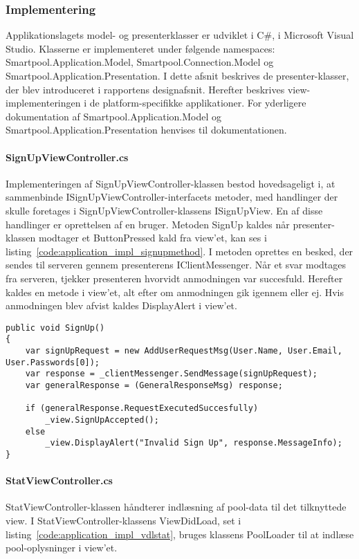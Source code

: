 \subsubsection{Implementering}
Applikationslagets model- og presenterklasser er udviklet i C\#, i Microsoft Visual Studio. Klasserne er implementeret under følgende namespaces: Smartpool.Application.Model, Smartpool.Connection.Model og Smartpool.Application.Presentation. I dette afsnit beskrives de presenter-klasser, der blev introduceret i rapportens designafsnit. Herefter beskrives view-implementeringen i de platform-specifikke applikationer. For yderligere dokumentation af Smartpool.Application.Model og Smartpool.Application.Presentation henvises til dokumentationen.

\paragraph{SignUpViewController.cs}
Implementeringen af SignUpViewController-klassen bestod hovedsageligt i, at sammenbinde ISignUpViewController-interfacets metoder, med handlinger der skulle foretages i SignUpViewController-klassens ISignUpView. En af disse handlinger er oprettelsen af en bruger. Metoden SignUp kaldes når presenter-klassen modtager et ButtonPressed kald fra view'et, kan ses i listing~\ref{code:application_impl_signupmethod}. I metoden oprettes en besked, der sendes til serveren gennem presenterens IClientMessenger. Når et svar modtages fra serveren, tjekker presenteren hvorvidt anmodningen var succesfuld. Herefter kaldes en metode i view'et, alt efter om anmodningen gik igennem eller ej. Hvis anmodningen blev afvist kaldes DisplayAlert i view'et.

\begin{lstlisting}[caption={SignUp()},label={code:application_impl_signupmethod}]
public void SignUp()
{
	var signUpRequest = new AddUserRequestMsg(User.Name, User.Email, User.Passwords[0]);
	var response = _clientMessenger.SendMessage(signUpRequest);
	var generalResponse = (GeneralResponseMsg) response;

	if (generalResponse.RequestExecutedSuccesfully)
		_view.SignUpAccepted();
	else
		_view.DisplayAlert("Invalid Sign Up", response.MessageInfo);
}
\end{lstlisting}

\paragraph{StatViewController.cs}
StatViewController-klassen håndterer indlæsning af pool-data til det tilknyttede view. I StatViewController-klassens ViewDidLoad, set i listing~\ref{code:application_impl_vdlstat}, bruges klassens PoolLoader til at indlæse pool-oplysninger i view'et.

